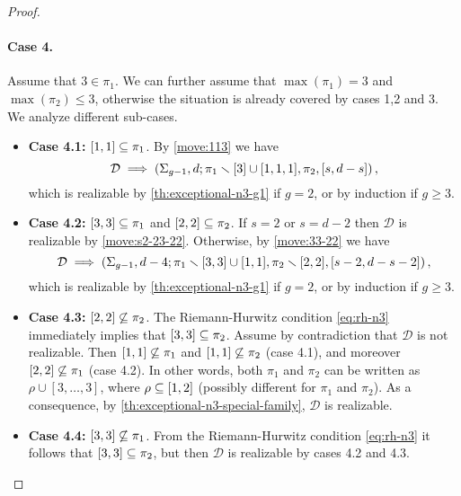 \documentclass{article}
\begin{document}
\begin{proof}
\paragraph{Case 4.} Assume that $3\in\pi_1$. We can further assume that $\max(\pi_1)=3$ and $\max(\pi_2)\le 3$, otherwise the situation is already covered by cases 1,2 and 3. We analyze different sub-cases.
\begin{itemize}[\phantom{}]
\item \textbf{Case 4.1:} $[1,1]\subseteq\pi_1$. By \cref{move:113} we have
\[
\mathcal{D}\implies\left(\Sigma_{g-1},d;\pi_1\smallsetminus[3]\cup[1,1,1],\pi_2,[s,d-s]\right),
\]
which is realizable by \cref{th:exceptional-n3-g1} if $g=2$, or by induction if $g\ge 3$.
\item \textbf{Case 4.2:} $[3,3]\subseteq\pi_1$ and $[2,2]\subseteq\pi_2$. If $s=2$ or $s=d-2$ then $\mathcal{D}$ is realizable by \cref{move:s2-23-22}. Otherwise, by \cref{move:33-22} we have
\[
\mathcal{D}\implies\left(\Sigma_{g-1},d-4;\pi_1\smallsetminus[3,3]\cup[1,1],\pi_2\smallsetminus[2,2],[s-2,d-s-2]\right),
\]
which is realizable by \cref{th:exceptional-n3-g1} if $g=2$, or by induction if $g\ge 3$.
\item \textbf{Case 4.3:} $[2,2]\not\subseteq\pi_2$. The Riemann-Hurwitz condition \eqref{eq:rh-n3} immediately implies that $[3,3]\subseteq\pi_2$. Assume by contradiction that $\mathcal{D}$ is not realizable. Then $[1,1]\not\subseteq\pi_1$ and $[1,1]\not\subseteq\pi_2$ (case 4.1), and moreover $[2,2]\not\subseteq\pi_1$ (case 4.2). In other words, both $\pi_1$ and $\pi_2$ can be written as $\rho\cup[3,\ldots,3]$, where $\rho\subseteq[1,2]$ (possibly different for $\pi_1$ and $\pi_2$). As a consequence, by \cref{th:exceptional-n3-special-family}, $\mathcal{D}$ is realizable.
\item \textbf{Case 4.4:} $[3,3]\not\subseteq\pi_1$. From the Riemann-Hurwitz condition \eqref{eq:rh-n3} it follows that $[3,3]\subseteq\pi_2$, but then $\mathcal{D}$ is realizable by cases 4.2 and 4.3.
\end{itemize}
\end{proof}
\end{document}
